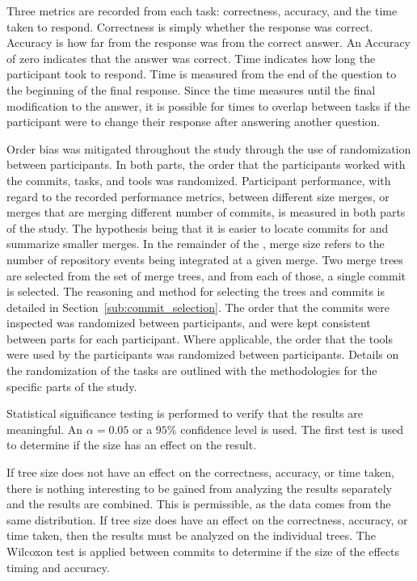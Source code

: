 Three metrics are recorded from each task:
correctness, accuracy, and the time taken to respond.
Correctness is simply whether the response was correct.
Accuracy is how far from the response was from the correct answer.
An Accuracy of zero indicates that the answer was correct.
Time indicates how long the participant took to respond.
Time is measured from the end of the question to the beginning of the
final response.
Since the time measures until the final modification to the answer,
it is possible for times to overlap between tasks if the participant
were to change their response after answering another question.

Order bias was mitigated throughout the study through the use of
randomization between participants. In both parts, the order that the
participants worked with the commits, tasks, and tools was randomized.
Participant performance, with regard to the recorded performance
metrics, between different size merges, or merges that are merging
different number of commits, is measured in both parts of the study. The
hypothesis being that it is easier to locate commits for and summarize
smaller merges. In the remainder of the \paper{}, merge size refers to
the number of repository events being integrated at a given merge. Two
merge trees are selected from the set of merge trees, and from each of
those, a single commit is selected. The reasoning and method for
selecting the trees and commits is detailed in
Section~\ref{sub:commit_selection}. The order that the commits were
inspected was randomized between participants, and were kept consistent
between parts for each participant. Where applicable, the order that the
tools were used by the participants was randomized between participants.
Details on the randomization of the tasks are outlined with the
methodologies for the specific parts of the study.

Statistical significance testing is performed to verify that the results
are meaningful.
An $\alpha = 0.05$ or a $95\%$ confidence level is used.
The first test is used to determine if the \mt{} size has an effect on
the result.

If tree size does not have an effect on the correctness, accuracy,
or time taken, there is nothing interesting to be gained from analyzing
the results separately and the results are combined.
This is permissible, as the data comes from the same distribution.
If tree size does have an effect on the correctness, accuracy, or time
taken, then the results must be analyzed on the individual trees.
The Wilcoxon test\cite{Wilcoxon45} is applied between commits to
determine if the size of the \mt effects timing and accuracy.

